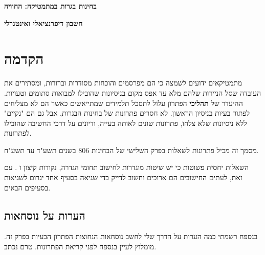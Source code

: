 

\thispagestyle{empty}

\begin{center}
\textbf{\LARGE בחינות בגרות במתמטיקה: החוויה}

\bigskip
\bigskip

\textbf{\LARGE חשבון דיפרנציאלי ואינטגרלי}
\end{center}



\section*{הקדמה}

מתמטיקאים ידועים לשמצה כי הם מפרסמים והוכחות מסודרות וברורות, ומסתירים את העובדה שסל הניירות שלהם מלא עד אפס מקום בניסיונות שהובילו למבואות סתומים וטעויות. ההיעדר של 
\textbf{תהליכי}
הפתרון עלול לתסכל תלמידים שמתייאשים כאשר הם לא מצליחים לפתור בעיות בניסיון הראשון. לא חסרים פתרונות של בחינות הבגרות, אבל גם הם "נקיים" ללא ניסיונות שלא צלחו, פתרונות שונים לאותה בעייה, ודיונים על דרכי החשיבה שהובילו לפתרונות.

מסמך זה מכיל פתרונות לשאלות בפרק השלישי של הבחינות 
$806$
בשנים תשע"ד עד תשע"ח. 

השאלות יחסית פשוטות כי יש שיטות מוגדרות לחישוב תחומי הגדרה, נקודות קיצון ו%
\asms{}.
עם זאת, לעתים החישובים הם ארוכים וחשוב לדייק כדי שגיאה בסעיף אחד יגרום לשגיאות בסעיפים הבאים.

\subsection*{הערות על נוסחאות}

בנספח רשמתי כמה הערות על הדרך שלי לחשב נוסחאות הנחוצות הפתרון הבעיות בפרק זה. מומלוץ לעיין בנספח לפני קריאת הפתרונות.
טרם נכתב.
